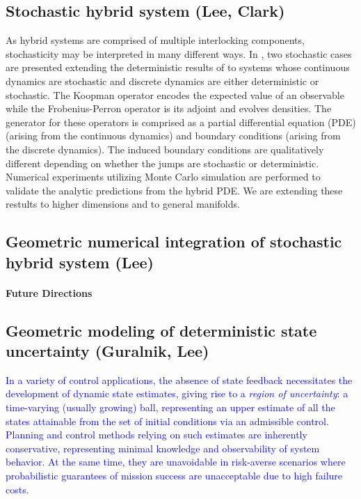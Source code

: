 \documentclass[letterpaper,11pt]{article}
\newcommand{\dg}[1]{{\textcolor{blue}{#1}}}
\begin{document}
\subsection{Stochastic hybrid system (Lee, Clark)}
As hybrid systems are comprised of multiple interlocking components, stochasticity may be interpreted in many different ways. In \cite{stochastic-hybrid}, two stochastic cases are presented extending the deterministic results of \cite{OpSh_fp} to systems whose continuous dynamics are stochastic and discrete dynamics are either deterministic or stochastic. The Koopman operator encodes the expected value of an observable while the Frobenius-Perron operator is its adjoint and evolves densities. The generator for these operators is comprised as a partial differential equation (PDE) (arising from the continuous dynamics) and boundary conditions (arising from the discrete dynamics). The induced boundary conditions are qualitatively different depending on whether the jumps are stochastic or deterministic. Numerical experiments utilizing Monte Carlo simulation are performed to validate the analytic predictions from the hybrid PDE. We are extending these restults to higher dimensions and to general manifolds.

\subsection{Geometric numerical integration of stochastic hybrid system (Lee)}
\paragraph*{Future Directions}

\subsection{Geometric modeling of deterministic state uncertainty (Guralnik, Lee)}
%
\dg{In a variety of control applications, the absence of state feedback necessitates the development of dynamic state estimates, giving rise to a \emph{region of uncertainty}: a time-varying (usually growing) ball, representing an upper estimate of all the states attainable from the set of initial conditions via an admissible control.
%
Planning and control methods relying on such estimates are inherently conservative, representing minimal knowledge and observability of system behavior.
%
At the same time, they are unavoidable in risk-averse scenarios where probabilistic guarantees of mission success are unacceptable due to high failure costs.
%
}
\end{document}
